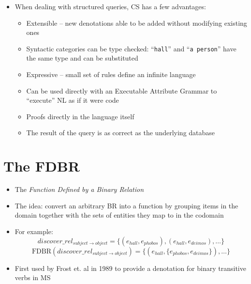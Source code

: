 \documentclass[logoontitle,tabu,supertabular,aspectratio=43]{preney-uwindsor-beamer}
\newcommand{\entityassoc}[1]{e_{#1}}
\newcommand{\FDBR}[1]{\mathrm{FDBR}({#1})}
\newcommand{\relationn}[3]{\mathit{#1\_rel_{#2 \rightarrow #3}}}
\begin{document}
	\begin{frame}{\insertsection}
		\begin{itemize}
			\item When dealing with structured queries, CS has a few advantages:
			\begin{itemize}
				\item Extensible -- new denotations able to be added without modifying existing ones
				\item Syntactic categories can be type checked: ``\texttt{hall}'' and ``\texttt{a person}'' have the same type and can be substituted
				\item Expressive -- small set of rules define an infinite language
				\item Can be used directly with an Executable Attribute Grammar \cite{frost1989constructing} to ``execute'' NL as if it were code
				\item Proofs directly in the language itself
				\item The result of the query is as correct as the underlying database
			\end{itemize}
		\end{itemize}
	\end{frame}

	\section{The FDBR}
	\begin{frame}{\insertsection}
		\begin{itemize}
			\item The {\em Function Defined by a Binary Relation}
			\item The idea: convert an arbitrary BR into a function by grouping items in the domain together with the sets of entities they map to in the codomain
			\item For example:
			\begin{equation*}
			\relationn{discover}{subject}{object} = \{(\entityassoc{hall}, \entityassoc{phobos}),(\entityassoc{hall},\entityassoc{deimos}),\ldots\}
			\end{equation*}
			\begin{equation*}
			\FDBR{\relationn{discover}{subject}{object}} = \big\{(\entityassoc{hall}, \{\entityassoc{phobos}, \entityassoc{deimos}\}), \ldots\big\}
			\end{equation*}
			\item First used by Frost et. al in 1989 \cite{frost1989constructing} to provide a denotation for binary transitive verbs in MS
		\end{itemize}
	\end{frame}
\end{document}
